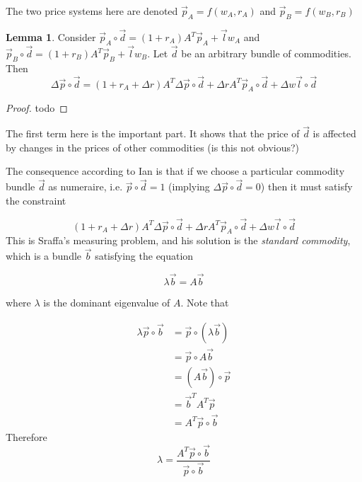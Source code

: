 \documentclass{article}
\theoremstyle{definition}
\newtheorem{lemma}{Lemma}[section]
\begin{document}
The two price systems here are denoted $\vec{p}_A = f(w_A,r_A)$ and $\vec{p}_B = f(w_B, r_B)$

\begin{lemma}
    Consider $\vec{p}_A \circ \vec{d} = (1+r_A)A^T\vec{p}_A+\vec{l}w_A$ and $\vec{p}_B \circ \vec{d} = (1+r_B)A^T\vec{p}_B+\vec{l}w_B$. Let $\vec{d}$ be an arbitrary bundle of commodities. Then
    \begin{equation}\label{price-fluctuations}
        \Delta \vec{p} \circ \vec{d} = (1+r_A+\Delta r)A^T\Delta \vec{p} \circ \vec{d} + \Delta r A^T\vec{p}_A \circ \vec{d} + \Delta w \vec{l} \circ \vec{d}
    \end{equation}
\end{lemma}

\begin{proof}
    todo
\end{proof}

The first term here is the important part. It shows that the price of $\vec{d}$ is affected by changes in the prices of other commodities (is this not obvious?)

The consequence according to Ian is that if we choose a particular commodity bundle $\vec{d}$ as numeraire, i.e. $\vec{p}\circ \vec{d} = 1$ (implying $\Delta \vec{p} \circ \vec{d} = 0$) then it must satisfy the constraint 

\[ (1+r_A+\Delta r)A^T\Delta \vec{p} \circ \vec{d} + \Delta r A^T\vec{p}_A \circ \vec{d} + \Delta w \vec{l} \circ \vec{d}
\]
This is Sraffa's measuring problem, and his solution is the \emph{standard commodity}, which is a bundle $\vec{b}$ satisfying the equation

\begin{equation}
    \lambda \vec{b} = A\vec{b}
\end{equation}

where $\lambda$ is the dominant eigenvalue of $A$. Note that 

\begin{align}
    \lambda \vec{p} \circ \vec{b} &= \vec{p} \circ (\lambda \vec{b}) \\
                                  &= \vec{p} \circ A\vec{b} \\
                                  &= (A\vec{b}) \circ \vec{p} \\
                                  &= \vec{b}^TA^T\vec{p} \\
                                  &= A^T\vec{p} \circ \vec{b}
\end{align}
Therefore 
\begin{equation}\label{standard-commodity}
    \lambda = \frac{A^T\vec{p} \circ \vec{b}}{\vec{p} \circ \vec{b}}
\end{equation}
\end{document}
